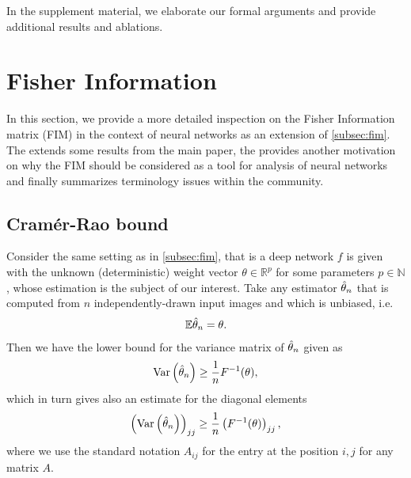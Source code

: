\clearpage
{}

In the supplement material, we elaborate our formal arguments and provide additional results and ablations.

\section{Fisher Information}
\label{suppl:fim}

In this section, we provide a more detailed inspection on the Fisher Information matrix (FIM) in the context of neural networks as an extension of \cref{subsec:fim}. The  extends some results from the main paper, the  provides another motivation on why the FIM should be considered as a tool for analysis of neural networks and finally  summarizes terminology issues within the community. 

\subsection{Cramér-Rao bound}
\label{subsec:cramer-rao}
Consider the same setting as in \cref{subsec:fim}, that is a deep network $f$ is given with the unknown (deterministic) weight vector $\theta\in\mathbb{R}^p$ for some parameters $p\in\mathbb{N}$, whose estimation is the subject of our interest. Take any estimator $\Hat{\theta}_n$ that is computed from $n$ independently-drawn input images and which is unbiased, i.e.
\begin{align}
    \mathbb{E}\Hat{\theta}_n=\theta.
    \label{supp:unbiased}
\end{align}
Then we have the lower bound for the variance matrix of $\Hat{\theta}_n$ given as
\begin{align}
    \text{Var}\left(\Hat{\theta}_n\right)\geq \frac{1}{n}F^{-1}(\theta),
    \label{supp:cramer_rao}
\end{align}
which in turn gives also an estimate for the diagonal elements
\begin{align}
    \left(\text{Var}\left(\Hat{\theta}_n\right)\right)_{jj}\geq \frac{1}{n}\left(F^{-1}(\theta)\right)_{jj},
    \label{supp:cramer_rao_diag}
\end{align}
where we use the standard notation $A_{ij}$ for the entry at the position $i,j$ for any matrix $A$.

